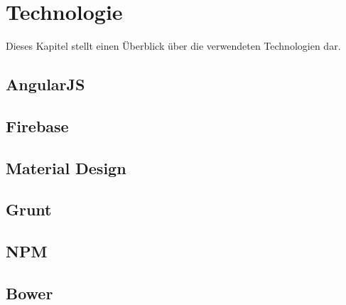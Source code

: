\chapter{Technologie}
Dieses Kapitel stellt einen Überblick über die verwendeten Technologien dar.
\section{AngularJS}
\section{Firebase}
\section{Material Design}
\section{Grunt}
\section{NPM}
\section{Bower}
